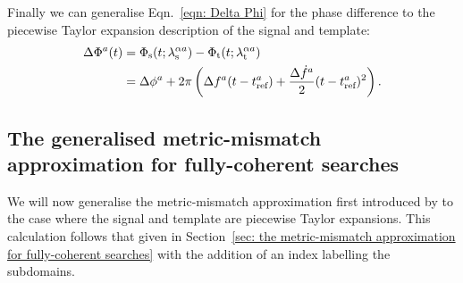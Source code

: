 \documentclass[../full_thesis/full_thesis.tex]{subfiles}
\begin{document}
Finally we can generalise Eqn.~\eqref{eqn: Delta Phi} for the phase difference
to the piecewise Taylor expansion description of the signal and template:
\begin{align}
\begin{split}
\Delta\Phi^{a}(t)& =  \Phi_{\textrm{s}}(t; {\lambda}_\textrm{s}^{\alpha a}) - \Phi_{\textrm{t}}(t; {\lambda}_\textrm{t}^{\alpha a})\\
& = \Delta\phi^{a} + 2\pi\left(\Delta f^{a}(t-t_{\textrm{ref}}^{a})
+ \frac{\Delta\dot{f}^{a}}{2}(t - t_{\textrm{ref}}^{a})^{2}\right).
\end{split}
\end{align}

\subsection{The generalised metric-mismatch approximation for fully-coherent
            searches}

We will now generalise the metric-mismatch approximation first introduced by
\citet{Brady1998} to the case where the signal and template are piecewise
Taylor expansions. This calculation follows that given in Section~\ref{sec: the
metric-mismatch approximation for fully-coherent searches} with the addition
of an index labelling the subdomains.
\end{document}
